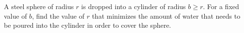 A steel sphere of radius $r$ is dropped into a cylinder of
radius $b \ge r$. For a fixed value of $b$, find the
value of $r$ that minimizes the amount of water that
needs to be poured into the cylinder in order to cover
the sphere.\answercheck
